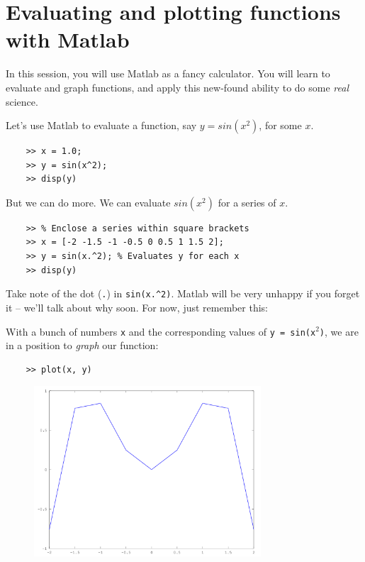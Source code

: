 \documentclass{article}
\begin{document}
\section*{Evaluating and plotting functions with Matlab}

In this session, you will use Matlab as a fancy calculator. You will learn
to evaluate and graph functions, and apply this new-found ability to do some
\emph{real} science.

Let's use Matlab to evaluate a function, say $y = sin(x^{2})$, for some
$x$.

\begin{verbatim}
    >> x = 1.0;        
    >> y = sin(x^2);
    >> disp(y)
\end{verbatim}

But we can do more. We can evaluate $sin(x^2)$ for a series
of $x$.

\begin{verbatim}
    >> % Enclose a series within square brackets
    >> x = [-2 -1.5 -1 -0.5 0 0.5 1 1.5 2];
    >> y = sin(x.^2); % Evaluates y for each x
    >> disp(y)
\end{verbatim}

Take note of the dot (\texttt{.}) in \texttt{sin(x.\^{}2)}. Matlab will be
very unhappy if you forget it -- we'll talk about why soon. For now, just remember
this:

\begin{figure}[hc]
\end{figure}

With a bunch of numbers \texttt{x} and the corresponding values of 
\texttt{y = sin(x$^2$)}, we are in a position to \emph{graph} our function:

\begin{verbatim}
    >> plot(x, y)
\end{verbatim}

\begin{figure}[h]
\begin{center}
\includegraphics[height=180pt]{figures/coarse.png}
\end{center}
\end{figure}
\end{document}
